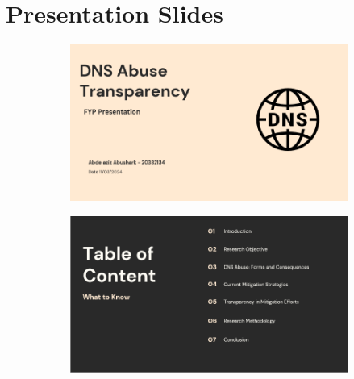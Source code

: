 \begin{itemize}
    
\end{itemize}





\section{Presentation Slides}

\begin{figure}[H]
  \centering
  \begin{subfigure}[b]{0.55\linewidth}
    \includegraphics[width=\linewidth]{appendix/PRE1.png}
    \label{fig:left}
  \end{subfigure}
  \hfill %
  \begin{subfigure}[b]{0.55\linewidth}
    \includegraphics[width=\linewidth]{appendix/PRE2.png}
    \label{fig:right}
  \end{subfigure}
  \label{fig:images}
\end{figure}

